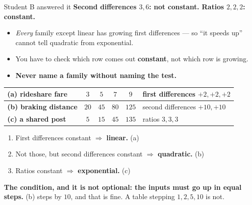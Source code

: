 \documentclass[aspectratio=169, 11pt]{beamer}
\begin{document}
\begin{frame}[t, plain]
  \begin{block}{Student B answered it}
    \centering\large
    \textbf{Second differences $3, 6$: not constant. \quad Ratios $2, 2, 2$: constant.}
  \end{block}
  \begin{itemize}
    \setlength{\itemsep}{0.3cm}
    \item \emph{Every} family except linear has growing first differences --- so ``it speeds up''
          cannot tell quadratic from exponential.
    \item You have to check which row comes out \textbf{constant}, not which row is growing.
    \item \textbf{Never name a family without naming the test.}
  \end{itemize}
\end{frame}

\begin{frame}[t, plain]
  \renewcommand{\arraystretch}{1.35}
  \small
  \begin{center}
  \begin{tabular}{@{}|l|c|c|c|c||l|@{}}
  \hline
  \textbf{(a) rideshare fare} & $3$ & $5$ & $7$ & $9$ & first differences $+2, +2, +2$ \\ \hline
  \textbf{(b) braking distance} & $20$ & $45$ & $80$ & $125$ & second differences $+10, +10$ \\ \hline
  \textbf{(c) a shared post} & $5$ & $15$ & $45$ & $135$ & ratios $3, 3, 3$ \\
  \hline
  \end{tabular}
  \end{center}
  \vspace{0.3cm}
  \begin{enumerate}
    \setlength{\itemsep}{0.2cm}
    \item First differences constant $\Rightarrow$ \textbf{linear.} \quad (a)
    \item Not those, but second differences constant $\Rightarrow$ \textbf{quadratic.} \quad (b)
    \item Ratios constant $\Rightarrow$ \textbf{exponential.} \quad (c)
  \end{enumerate}
  \vspace{0.15cm}
  \textbf{The condition, and it is not optional: the inputs must go up in equal steps.} (b) steps by
  $10$, and that is fine. A table stepping $1, 2, 5, 10$ is not.
\end{frame}
\end{document}
